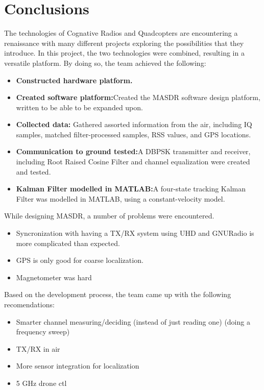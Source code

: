 \chapter{Conclusions}
The technologies of Cognative Radios and Quadcopters are encountering a renaissance
with many different projects exploring the possibilities that they introduce. In this project,
the two technologies were combined, resulting in a versatile platform. By doing so, 
the team achieved the following:
\begin{itemize} 
 \item \textbf{Constructed hardware platform.}
 \item \textbf{Created software platform:}Created the MASDR software design platform,
                    written to be able to be expanded upon. 
 \item \textbf{Collected data:} Gathered assorted information from the air, including 
                IQ samples, matched filter-processed samples, RSS values, and GPS locations.
 \item \textbf{Communication to ground tested:}A DBPSK transmitter and receiver, 
                including Root Raised Cosine Filter and channel equalization were created and tested. 
 \item \textbf{Kalman Filter modelled in MATLAB:}A four-state tracking Kalman Filter
                was modelled in MATLAB, using a constant-velocity model.
\end{itemize} \par
While designing MASDR, a number of problems were encountered.
\begin{itemize}
 \item Syncronization with having a TX/RX system using UHD and GNURadio is more complicated than expected.
 \item GPS is only good for coarse localization.
 \item Magnetometer was hard
\end{itemize}
Based on the development process, the team came up with the following recomendations:
\begin{itemize}
 \item Smarter channel measuring/deciding (instead of just reading one) (doing a frequency sweep)
 \item TX/RX in air
 \item More sensor integration for localization
 \item 5 GHz drone ctl
\end{itemize}

